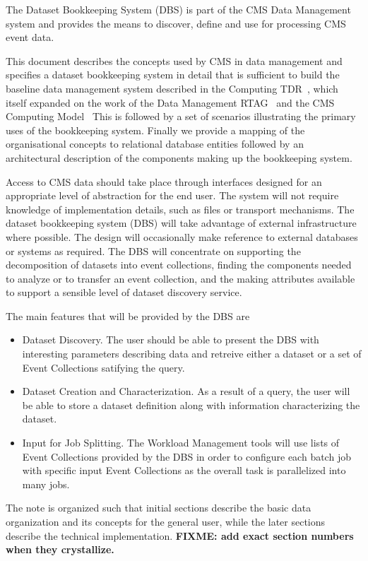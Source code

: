 \documentclass[pdftex]{cmspaper}
\begin{document}
The Dataset Bookkeeping System (DBS) is part of the CMS Data Management system
and provides the means to discover, define and use for processing CMS event 
data. 

This document describes the concepts used by CMS in data management and
specifies a dataset bookkeeping system in detail that is sufficient to build 
the baseline data management system described in the Computing 
TDR~\cite{CTDR}, which itself expanded on the work of the Data 
Management RTAG~\cite{rtag7} and the CMS Computing Model~\cite{CM} This is 
followed by a set of scenarios illustrating the primary uses of the
bookkeeping system.  Finally we provide a mapping of the organisational
concepts to relational database entities followed by an architectural
description of the components making up the bookkeeping system.

Access to CMS data should take place through interfaces designed for an 
appropriate level of abstraction for the end user.  The system will not require 
knowledge of implementation details, such as files or transport mechanisms. 
The dataset bookkeeping system (DBS) will take advantage of external infrastructure where 
possible.  The design will occasionally make 
reference to external databases or systems as required.  The DBS will 
concentrate on supporting the decomposition of datasets into event collections, 
finding the 
components needed to analyze or to transfer an event collection, and the making 
attributes available to support a sensible level of dataset discovery service.  

The main features that will be provided by the DBS are 
\begin{itemize}
\item Dataset Discovery.  The user should be able to present the DBS with 
interesting parameters describing data and retreive either a dataset or
a set of Event Collections satifying the query.
\item Dataset Creation and Characterization.  As a result of a query, the 
user will be able to store a dataset definition along with information 
characterizing the dataset.
\item Input for Job Splitting. The Workload Management tools will use
lists of Event Collections provided by the DBS in order to configure each
batch job with specific input Event Collections as the overall task is
parallelized into many jobs.

\end{itemize}

  The note is organized such that initial sections describe the basic
data organization and its concepts for the general user, while the later
sections describe the technical implementation. {\bf FIXME: add exact
section numbers when they crystallize.}
\end{document}
